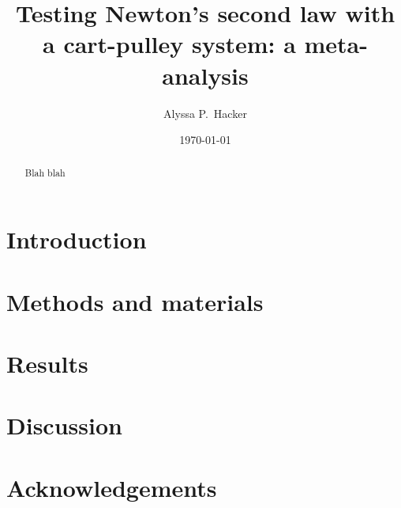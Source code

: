 \documentclass[reprint,amsmath,amssymb,aps,twoside]{revtex4-2}
\begin{document}
\setcounter{page}{1}
\title{Testing Newton's second law with a cart-pulley system: a meta-analysis}

\author{Alyssa P.~Hacker}
\date{\today}

\begin{abstract}
Blah blah
\end{abstract}


\maketitle\thispagestyle{mytitlepage}





\section{Introduction}
\section{Methods and materials}
\section{Results}
\section{Discussion}
\section{Acknowledgements}

\end{document}
